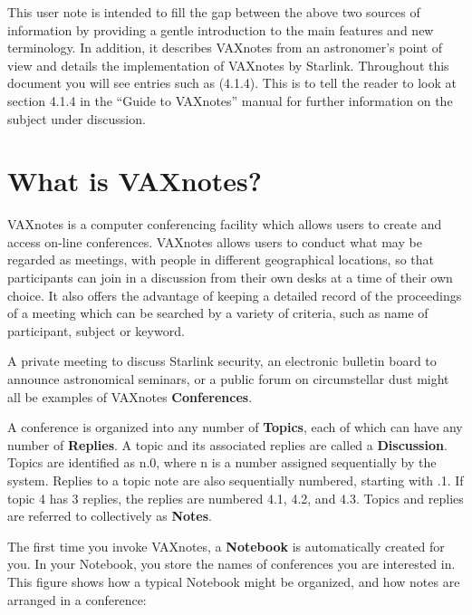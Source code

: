 This user note is intended to fill the gap between the above two sources
of information by providing a gentle introduction to the main features and
new terminology.
In addition, it describes VAXnotes from an astronomer's
point of view and details the implementation of VAXnotes by Starlink.
Throughout this document you will see entries such as (4.1.4).
This is to tell the reader to look at section 4.1.4 in the ``Guide to
VAXnotes'' manual for further information on the subject under discussion.

\section{What is VAXnotes?}

VAXnotes is a computer conferencing facility which allows users to create and
access on-line conferences. VAXnotes allows users to conduct
what may be regarded as meetings, with people in different geographical locations, so that participants
can join in a discussion from their own desks at a time of their own choice. It
also offers the advantage of keeping a detailed record of the proceedings of a
meeting which can be searched by a variety of criteria, such as name of
participant, subject or keyword.

A private meeting to discuss Starlink security, an electronic
bulletin board to announce astronomical seminars, or a public forum on
circumstellar dust might all be examples of VAXnotes {\bf Conferences}.

A conference is organized into any number of {\bf Topics}, each of which can
have any number of {\bf Replies}.  A topic and its associated replies are
called a {\bf Discussion}.  Topics are identified as n.0, where n is a
number assigned sequentially by the system.  Replies to a topic note
are also sequentially numbered, starting with .1.  If topic 4 has 3
replies, the replies are numbered 4.1, 4.2, and 4.3.  Topics and
replies are referred to collectively as {\bf Notes}.

The first time you invoke VAXnotes, a {\bf Notebook} is automatically
created for you.  In your Notebook, you store the names of conferences
you are interested in.  This figure shows how a typical Notebook might
be organized, and how notes are arranged in a conference:

